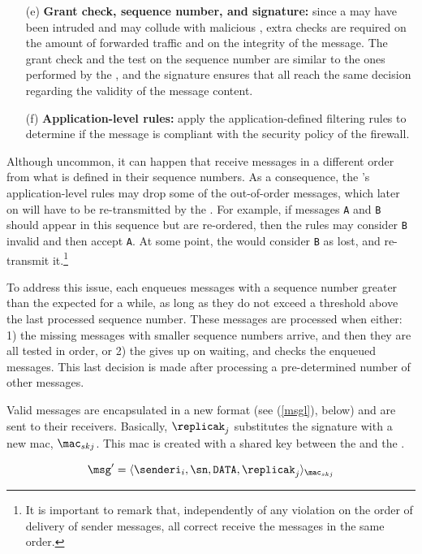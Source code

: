\begin{enumerate}
\item[(e)] \textbf{Grant check, sequence number, and signature:} since a \presieve may have been intruded and may collude with malicious \sender, extra checks are required on the amount of forwarded traffic and on the integrity of the message.
The grant check and the test on the sequence number are similar to the ones performed by the \presieve, and the signature ensures that all \repsieves reach the same decision regarding the validity of the message content.
\item[(f)] \textbf{Application-level rules:} apply the application-defined filtering rules to determine if the message is compliant with the security policy of the firewall.
\end{enumerate}

Although uncommon, it can happen that \repsieves receive messages in a different order from what is defined in their sequence numbers.
As a consequence, the \repsieve's application-level rules may drop some of the out-of-order messages, which later on will have to be re-transmitted by the \sender.
For example, if messages \texttt{A} and \texttt{B} should appear in this sequence but are re-ordered, then the rules may consider \texttt{B} invalid and then accept \texttt{A}.
At some point, the \sender would consider \texttt{B} as lost, and re-transmit it.\footnote{It is important to remark that, independently of any violation on the order of delivery of sender messages, all correct \repsieves receive the messages in the same order.}

To address this issue, each \repsieve enqueues messages with a sequence number greater than the expected for a while, as long as they do not exceed a threshold above the last processed sequence number. These messages are processed when either: 1) the missing messages with smaller sequence numbers arrive, and then they are all tested in order, or 2) the \repsieve gives up on waiting, and checks the enqueued messages. This last decision is made after processing a pre-determined number of other messages.

Valid messages are encapsulated in a new format (see (\ref{msgl}), below) and are sent to their receivers.
Basically, \repsieve $\replicak_j$ substitutes the signature with a new \gls{mac}, $\mac_{skj}$.
This \gls{mac} is created with a shared key between the \repsieve and the \postsieve.

\begin{equation}
\msg' = \langle \senderi_i, \sn, \texttt{DATA}, \replicak_j \rangle_{\mac_{skj}}
\label{msgl}
\end{equation}

